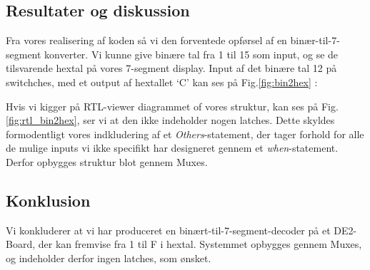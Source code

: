 \documentclass[../journal.tex]{subfiles}
\begin{document}
%            

\subsection{Resultater og diskussion}


Fra vores realisering af koden så vi den forventede opførsel af en binær-til-7-segment konverter. Vi kunne give binære tal fra 1 til 15 som input, og se de tilsvarende hextal på vores 7-segment display. Input af det binære tal 12 på switchches, med et output af hextallet `C' kan ses på Fig.\ref{fig:bin2hex} :


Hvis vi kigger på RTL-viewer diagrammet of vores struktur, kan ses på Fig.\ref{fig:rtl_bin2hex}, ser vi at den ikke indeholder nogen latches. Dette skyldes formodentligt vores indkludering af et \textit{Others}-statement, der tager forhold for alle de mulige inputs vi ikke specifikt har designeret gennem et \textit{when}-statement. Derfor opbygges struktur blot gennem Muxes.


\subsection{Konklusion}

Vi konkluderer at vi har produceret en binært-til-7-segment-decoder på et DE2-Board, der kan fremvise fra 1 til F i hextal. Systemmet opbygges gennem Muxes, og indeholder derfor ingen latches, som ønsket. 
\end{document}
